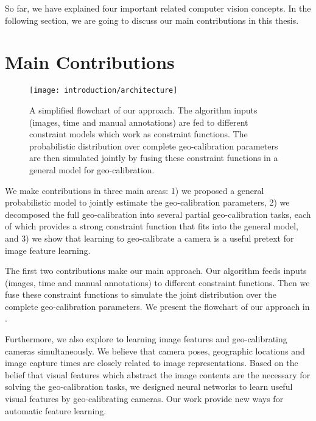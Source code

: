 So far, we have explained four important related computer vision
concepts. In the following section, we are going to discuss our main
contributions in this thesis.

\section{Main Contributions}

\begin{figure}
  \centering
  \texttt{[image: introduction/architecture]}
  \caption{A simplified flowchart of our approach. The algorithm
inputs (images, time and manual annotations) are fed to different
constraint models which work as constraint functions. 
The probabilistic distribution over complete geo-calibration
parameters are then simulated jointly by fusing these constraint
functions in a general model for geo-calibration.}
  \label{fig:intro:architecture}
\end{figure}

We make contributions in three main areas: 1) we proposed a general
probabilistic model to jointly estimate the geo-calibration
parameters, 2) we decomposed the full geo-calibration into several
partial geo-calibration tasks, each of which provides a strong
constraint function that fits into the general model, and 3) we show
that learning to geo-calibrate a camera is a useful pretext for image
feature learning.
 
The first two contributions make our main approach. Our
algorithm feeds inputs (images, time and manual annotations) to
different constraint functions. Then
we fuse these constraint functions to simulate the joint distribution
over the complete geo-calibration parameters. We present the flowchart of
our approach in .

Furthermore, we also explore to learning image features
and geo-calibrating cameras simultaneously.  We believe that camera
poses, geographic locations and image capture times are closely
related to image representations. 
Based on the belief that visual features which abstract the image
contents are the necessary for solving the geo-calibration tasks, we
designed neural networks to learn useful visual features by
geo-calibrating cameras. Our work provide new ways for automatic
feature learning.


